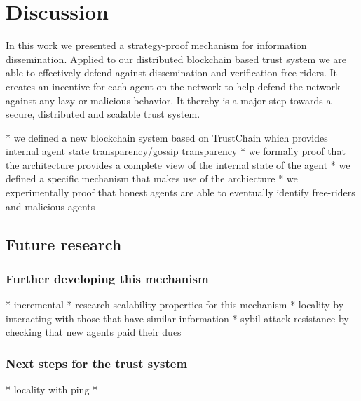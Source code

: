 \chapter{Discussion}
In this work we presented a strategy-proof mechanism for information dissemination. Applied to our 
distributed blockchain based trust system we are able to effectively defend against dissemination 
and verification free-riders. It creates an incentive for each agent on the network to help defend 
the network against any lazy or malicious behavior. It thereby is a major step towards a secure, 
distributed and scalable trust system.

* we defined a new blockchain system based on TrustChain which provides internal agent state 
transparency/gossip transparency
* we formally proof that the architecture provides a complete view of the internal state of the 
agent
* we defined a specific mechanism that makes use of the archiecture
* we experimentally proof that honest agents are able to eventually identify free-riders and malicious
agents

\section{Future research}

\subsection{Further developing this mechanism}
* incremental 
* research scalability properties for this mechanism
* locality by interacting with those that have similar information
* sybil attack resistance by checking that new agents paid their dues

\subsection{Next steps for the trust system}
* locality with ping
* 